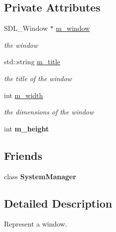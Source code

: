 \subsection*{Private Attributes}
\begin{DoxyCompactItemize}
\item 
\mbox{\label{classnta_1_1Window_a1e216236a7fdee82775fadef72a972ae}} 
S\+D\+L\+\_\+\+Window $\ast$ \hyperlink{classnta_1_1Window_a1e216236a7fdee82775fadef72a972ae}{m\+\_\+window}
\begin{DoxyCompactList}\small\item\em the window \end{DoxyCompactList}\item 
\mbox{\label{classnta_1_1Window_a9034f9c0d5054ffd61782e2722432c63}} 
std\+::string \hyperlink{classnta_1_1Window_a9034f9c0d5054ffd61782e2722432c63}{m\+\_\+title}
\begin{DoxyCompactList}\small\item\em the title of the window \end{DoxyCompactList}\item 
\mbox{\label{classnta_1_1Window_aafa280d9434d31442028729eb0b01689}} 
int \hyperlink{classnta_1_1Window_aafa280d9434d31442028729eb0b01689}{m\+\_\+width}
\begin{DoxyCompactList}\small\item\em the dimensions of the window \end{DoxyCompactList}\item 
\mbox{\label{classnta_1_1Window_a3857aecdc891f739b24030f7e8423529}} 
int {\bfseries m\+\_\+height}
\end{DoxyCompactItemize}
\subsection*{Friends}
\begin{DoxyCompactItemize}
\item 
\mbox{\label{classnta_1_1Window_ab1ef2aa9992dd8ae85793e1a1f980e1e}} 
class {\bfseries System\+Manager}
\end{DoxyCompactItemize}


\subsection{Detailed Description}
Represent a window. 

